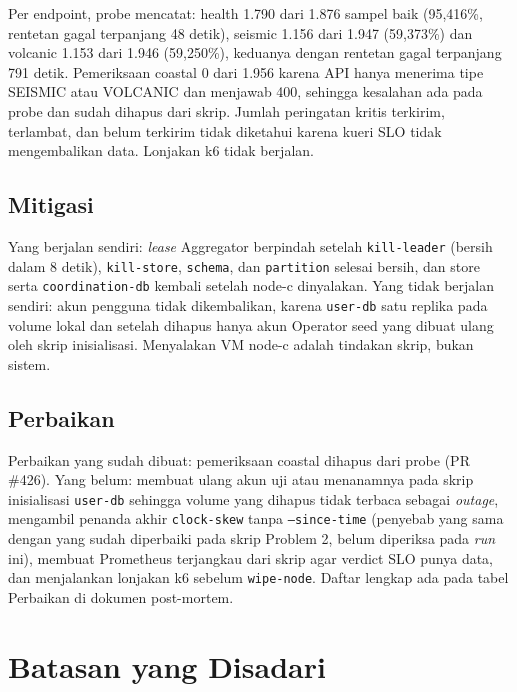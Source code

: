 Per endpoint, probe mencatat: health 1.790 dari 1.876 sampel baik (95,416\%, rentetan gagal terpanjang 48 detik), seismic 1.156 dari 1.947 (59,373\%) dan volcanic 1.153 dari 1.946 (59,250\%), keduanya dengan rentetan gagal terpanjang 791 detik. Pemeriksaan coastal 0 dari 1.956 karena API hanya menerima tipe SEISMIC atau VOLCANIC dan menjawab 400, sehingga kesalahan ada pada probe dan sudah dihapus dari skrip. Jumlah peringatan kritis terkirim, terlambat, dan belum terkirim tidak diketahui karena kueri SLO tidak mengembalikan data. Lonjakan k6 tidak berjalan.

\subsection{Mitigasi}

Yang berjalan sendiri: \textit{lease} Aggregator berpindah setelah \texttt{kill-leader} (bersih dalam 8 detik), \texttt{kill-store}, \texttt{schema}, dan \texttt{partition} selesai bersih, dan store serta \texttt{coordination-db} kembali setelah node-c dinyalakan. Yang tidak berjalan sendiri: akun pengguna tidak dikembalikan, karena \texttt{user-db} satu replika pada volume lokal dan setelah dihapus hanya akun Operator seed yang dibuat ulang oleh skrip inisialisasi. Menyalakan VM node-c adalah tindakan skrip, bukan sistem.

\subsection{Perbaikan}

Perbaikan yang sudah dibuat: pemeriksaan coastal dihapus dari probe (PR \#426). Yang belum: membuat ulang akun uji atau menanamnya pada skrip inisialisasi \texttt{user-db} sehingga volume yang dihapus tidak terbaca sebagai \textit{outage}, mengambil penanda akhir \texttt{clock-skew} tanpa \texttt{--since-time} (penyebab yang sama dengan yang sudah diperbaiki pada skrip Problem 2, belum diperiksa pada \textit{run} ini), membuat Prometheus terjangkau dari skrip agar verdict SLO punya data, dan menjalankan lonjakan k6 sebelum \texttt{wipe-node}. Daftar lengkap ada pada tabel Perbaikan di dokumen post-mortem.

\section{Batasan yang Disadari}\label{sec:p5m2-batasan}

